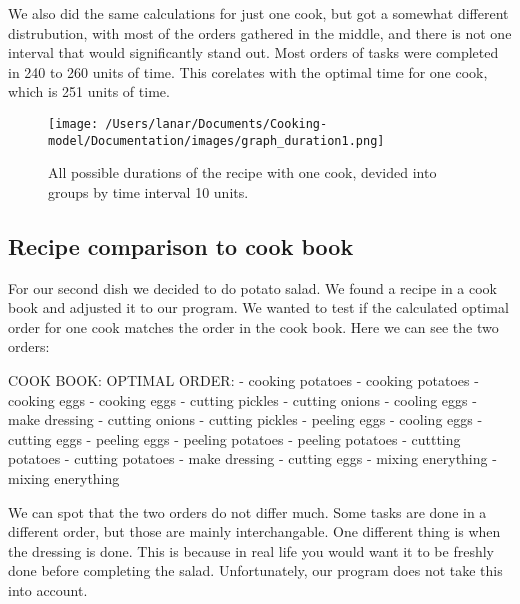 We also did the same calculations for just one cook, but got a somewhat different distrubution, with most of the orders gathered in the middle, and there is not one interval that would significantly stand out. 
Most orders of tasks were completed in 240 to 260 units of time. This corelates with the optimal time for one cook, which is 251 units of time.

\begin{figure}[H]
    \centerline{\texttt{[image: /Users/lanar/Documents/Cooking-model/Documentation/images/graph\_duration1.png]}}
    \caption{All possible durations of the recipe with one cook, devided into groups by time interval 10 units.}
    \label{fig5}
\end{figure}

\newpage
\subsection{Recipe comparison to cook book}
For our second dish we decided to do potato salad. We found a recipe in a cook book \cite[page 42]{book} and adjusted it to our program. We wanted to test if the calculated optimal order for one cook matches the order in the cook book.
Here we can see the two orders:

\begin{verbnobox}[\fontsize{10pt}{10pt}\selectfont]
    COOK BOOK:                                  OPTIMAL ORDER:
    - cooking potatoes                          - cooking potatoes
    - cooking eggs                              - cooking eggs
    - cutting pickles                           - cutting onions
    - cooling eggs                              - make dressing
    - cutting onions                            - cutting pickles
    - peeling eggs                              - cooling eggs
    - cutting eggs                              - peeling eggs
    - peeling potatoes                          - peeling potatoes
    - cuttting potatoes                         - cutting potatoes
    - make dressing                             - cutting eggs
    - mixing enerything                         - mixing enerything
\end{verbnobox}

We can spot that the two orders do not differ much. Some tasks are done in a different order, but those are mainly interchangable. One different thing is when the dressing is done. 
This is because in real life you would want it to be freshly done before completing the salad. Unfortunately, our program does not take this into account. 

